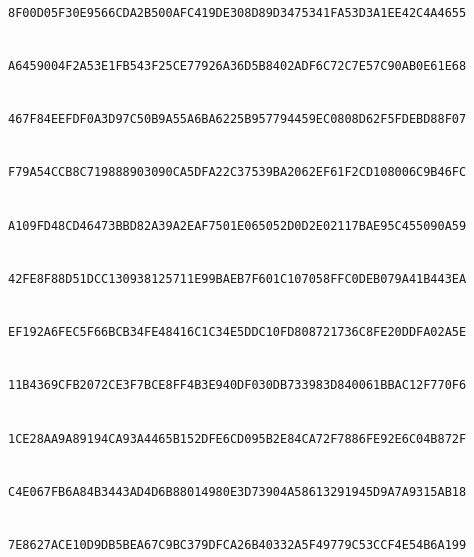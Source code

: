 \noindent{}\\
\nolinkurl{8F00D05F30E9566CDA2B500AFC419DE308D89D3475341FA53D3A1EE42C4A4655}\par
\smallskip
\noindent{}\\
\nolinkurl{A6459004F2A53E1FB543F25CE77926A36D5B8402ADF6C72C7E57C90AB0E61E68}\par
\smallskip
\noindent{}\\
\nolinkurl{467F84EEFDF0A3D97C50B9A55A6BA6225B957794459EC0808D62F5FDEBD88F07}\par
\smallskip
\noindent{}\\
\nolinkurl{F79A54CCB8C719888903090CA5DFA22C37539BA2062EF61F2CD108006C9B46FC}\par
\smallskip
\noindent{}\\
\nolinkurl{A109FD48CD46473BBD82A39A2EAF7501E065052D0D2E02117BAE95C455090A59}\par
\smallskip
\noindent{}\\
\nolinkurl{42FE8F88D51DCC130938125711E99BAEB7F601C107058FFC0DEB079A41B443EA}\par
\smallskip
\noindent{}\\
\nolinkurl{EF192A6FEC5F66BCB34FE48416C1C34E5DDC10FD808721736C8FE20DDFA02A5E}\par
\smallskip
\noindent{}\\
\nolinkurl{11B4369CFB2072CE3F7BCE8FF4B3E940DF030DB733983D840061BBAC12F770F6}\par
\smallskip
\noindent{}\\
\nolinkurl{1CE28AA9A89194CA93A4465B152DFE6CD095B2E84CA72F7886FE92E6C04B872F}\par
\smallskip
\noindent{}\\
\nolinkurl{C4E067FB6A84B3443AD4D6B88014980E3D73904A58613291945D9A7A9315AB18}\par
\smallskip
\noindent{}\\
\nolinkurl{7E8627ACE10D9DB5BEA67C9BC379DFCA26B40332A5F49779C53CCF4E54B6A199}\par

